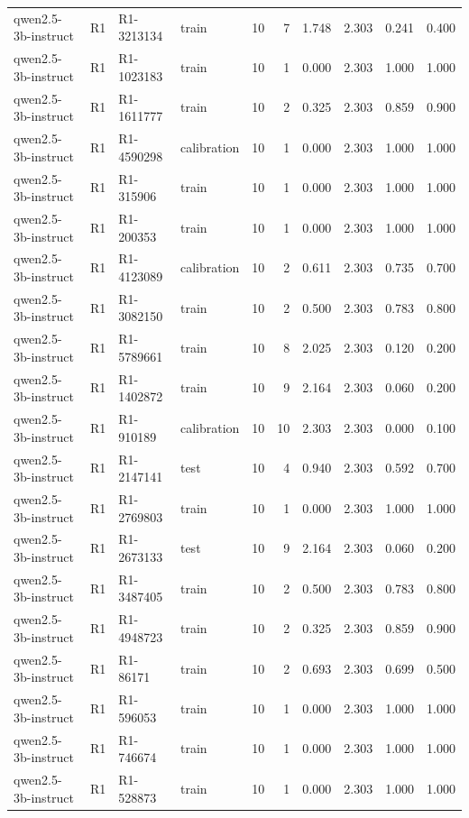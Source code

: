 \begin{table}
\begin{tabular}{llllrrrrrr}
qwen2.5-3b-instruct & R1 & R1-3213134 & train & 10 & 7 & 1.748 & 2.303 & 0.241 & 0.400 \\
qwen2.5-3b-instruct & R1 & R1-1023183 & train & 10 & 1 & 0.000 & 2.303 & 1.000 & 1.000 \\
qwen2.5-3b-instruct & R1 & R1-1611777 & train & 10 & 2 & 0.325 & 2.303 & 0.859 & 0.900 \\
qwen2.5-3b-instruct & R1 & R1-4590298 & calibration & 10 & 1 & 0.000 & 2.303 & 1.000 & 1.000 \\
qwen2.5-3b-instruct & R1 & R1-315906 & train & 10 & 1 & 0.000 & 2.303 & 1.000 & 1.000 \\
qwen2.5-3b-instruct & R1 & R1-200353 & train & 10 & 1 & 0.000 & 2.303 & 1.000 & 1.000 \\
qwen2.5-3b-instruct & R1 & R1-4123089 & calibration & 10 & 2 & 0.611 & 2.303 & 0.735 & 0.700 \\
qwen2.5-3b-instruct & R1 & R1-3082150 & train & 10 & 2 & 0.500 & 2.303 & 0.783 & 0.800 \\
qwen2.5-3b-instruct & R1 & R1-5789661 & train & 10 & 8 & 2.025 & 2.303 & 0.120 & 0.200 \\
qwen2.5-3b-instruct & R1 & R1-1402872 & train & 10 & 9 & 2.164 & 2.303 & 0.060 & 0.200 \\
qwen2.5-3b-instruct & R1 & R1-910189 & calibration & 10 & 10 & 2.303 & 2.303 & 0.000 & 0.100 \\
qwen2.5-3b-instruct & R1 & R1-2147141 & test & 10 & 4 & 0.940 & 2.303 & 0.592 & 0.700 \\
qwen2.5-3b-instruct & R1 & R1-2769803 & train & 10 & 1 & 0.000 & 2.303 & 1.000 & 1.000 \\
qwen2.5-3b-instruct & R1 & R1-2673133 & test & 10 & 9 & 2.164 & 2.303 & 0.060 & 0.200 \\
qwen2.5-3b-instruct & R1 & R1-3487405 & train & 10 & 2 & 0.500 & 2.303 & 0.783 & 0.800 \\
qwen2.5-3b-instruct & R1 & R1-4948723 & train & 10 & 2 & 0.325 & 2.303 & 0.859 & 0.900 \\
qwen2.5-3b-instruct & R1 & R1-86171 & train & 10 & 2 & 0.693 & 2.303 & 0.699 & 0.500 \\
qwen2.5-3b-instruct & R1 & R1-596053 & train & 10 & 1 & 0.000 & 2.303 & 1.000 & 1.000 \\
qwen2.5-3b-instruct & R1 & R1-746674 & train & 10 & 1 & 0.000 & 2.303 & 1.000 & 1.000 \\
qwen2.5-3b-instruct & R1 & R1-528873 & train & 10 & 1 & 0.000 & 2.303 & 1.000 & 1.000 \\

\end{tabular}
\end{table}
